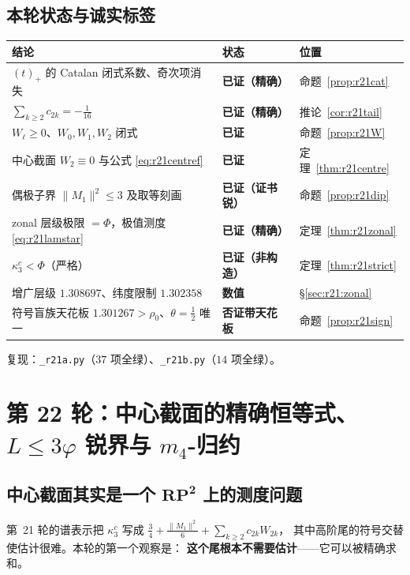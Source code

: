 \documentclass[UTF8,11pt]{ctexart}
\theoremstyle{definition}
\begin{document}
\subsection{本轮状态与诚实标签}\label{sec:r21:status}

\begin{center}\small
\begin{tabular}{lll}
\toprule
结论 & 状态 & 位置\\
\midrule
$(t)_+$ 的 Catalan 闭式系数、奇次项消失 & \textbf{已证（精确）} & 命题~\ref{prop:r21cat}\\
$\sum_{k\ge2}c_{2k}=-\frac1{16}$ & \textbf{已证（精确）} & 推论~\ref{cor:r21tail}\\
$W_\ell\ge0$、$W_0,W_1,W_2$ 闭式 & \textbf{已证} & 命题~\ref{prop:r21W}\\
中心截面 $W_2\equiv0$ 与公式 \eqref{eq:r21centref} & \textbf{已证} & 定理~\ref{thm:r21centre}\\
偶极子界 $\|M_1\|^2\le3$ 及取等刻画 & \textbf{已证（证书锐）} & 命题~\ref{prop:r21dip}\\
zonal 层级极限 $=\Phi$，极值测度 \eqref{eq:r21lamstar} & \textbf{已证（精确）} & 定理~\ref{thm:r21zonal}\\
$\kappa_3^c<\Phi$（严格） & \textbf{已证（非构造）} & 定理~\ref{thm:r21strict}\\
增广层级 $1.308697$、纬度限制 $1.302358$ & \textbf{数值} & \S\ref{sec:r21:zonal}\\
符号盲族天花板 $1.301267>\rho_0$、$\theta=\frac12$ 唯一 & \textbf{否证带天花板} & 命题~\ref{prop:r21sign}\\
\bottomrule
\end{tabular}
\end{center}

复现：\texttt{\_r21a.py}（$37$ 项全绿）、\texttt{\_r21b.py}（$14$ 项全绿）。

\section{第 22 轮：中心截面的精确恒等式、$L\le3\varphi$ 锐界与 $m_4$-归约}\label{sec:r22}

\subsection{中心截面其实是一个 $\mathbf{RP^2}$ 上的测度问题}\label{sec:r22:exact}

第~21 轮的谱表示把 $\kappa_3^c$ 写成 $\frac34+\frac{\|M_1\|^2}6+\sum_{k\ge2}c_{2k}W_{2k}$，
其中高阶尾的符号交替使估计很难。本轮的第一个观察是：
\textbf{这个尾根本不需要估计}——它可以被精确求和。
\end{document}
